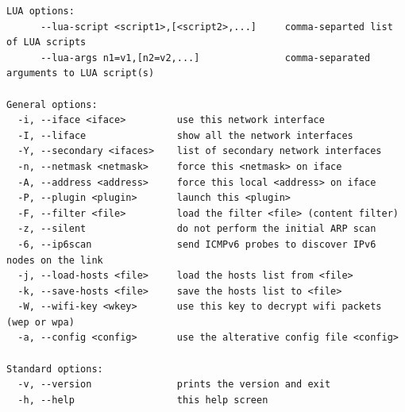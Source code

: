 \documentclass{article}
\begin{document}
\begin{lstlisting}
LUA options:
      --lua-script <script1>,[<script2>,...]     comma-separted list of LUA scripts
      --lua-args n1=v1,[n2=v2,...]               comma-separated arguments to LUA script(s)

General options:
  -i, --iface <iface>         use this network interface
  -I, --liface                show all the network interfaces
  -Y, --secondary <ifaces>    list of secondary network interfaces
  -n, --netmask <netmask>     force this <netmask> on iface
  -A, --address <address>     force this local <address> on iface
  -P, --plugin <plugin>       launch this <plugin>
  -F, --filter <file>         load the filter <file> (content filter)
  -z, --silent                do not perform the initial ARP scan
  -6, --ip6scan               send ICMPv6 probes to discover IPv6 nodes on the link
  -j, --load-hosts <file>     load the hosts list from <file>
  -k, --save-hosts <file>     save the hosts list to <file>
  -W, --wifi-key <wkey>       use this key to decrypt wifi packets (wep or wpa)
  -a, --config <config>       use the alterative config file <config>

Standard options:
  -v, --version               prints the version and exit
  -h, --help                  this help screen
\end{lstlisting}
\end{document}
